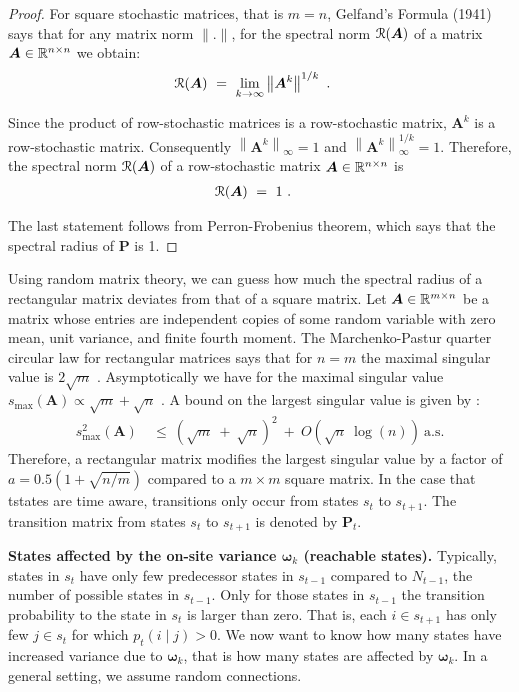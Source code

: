 \documentclass{article}
\newcommand\BA{\bm{A}}
\newcommand\BP{\bm{P}}
\newcommand\Bom{\bm{\omega}}
\renewcommand{\leq}{\leqslant}
\begin{document}
\begin{appendices}
\begin{proof}
For square stochastic matrices, that is $m=n$,
Gelfand's Formula (1941) says that
for any matrix norm $\| . \|$, for the spectral norm
$\cR(\BA)$ of a matrix $\BA \in \dR^{n\times n}$ we obtain:
\begin{align}
 \cR (\BA) \ &= \ \lim_{k\to \infty } \left\|\BA^k\right\|^{1/ k} \ .
\end{align} 


Since the product of row-stochastic matrices is a row-stochastic
matrix, $\BA^k$ is a row-stochastic matrix.
Consequently $\left\|\BA^k\right\|_{\infty}=1$ and $\left\|\BA^k\right\|_{\infty}^{1/ k}=1$. 
Therefore, the spectral norm
$\cR(\BA)$ of a row-stochastic matrix $\BA \in \dR^{n\times n}$
is
\begin{align}
 \cR (\BA) \ &= \  1 \ .
\end{align} 

The last statement follows from
Perron-Frobenius theorem, which says that the spectral radius of $\BP$ is 1. 
\end{proof}

Using random matrix theory, we can guess how much the spectral radius
of a rectangular matrix deviates from that of a square matrix.
Let $\BA \in \dR^{m \times n}$ be a matrix whose entries are independent copies of some random
variable with zero mean, unit variance, and finite fourth moment.
The Marchenko-Pastur quarter circular law for rectangular
matrices says that for $n=m$ the maximal singular value
is $2 \sqrt{m}$ \cite{Marchenko:67}.
Asymptotically we have for the maximal
singular value $s_{\max}(\BA) \propto \sqrt{m} + \sqrt{n}$ \cite{Rudelson:10}. 
A bound on the largest singular value is given by \cite{Soshnikov:02}:
\begin{align}
 s_{\max}^2(\BA) \ &\leq  \ (\sqrt{m} \ + \ \sqrt{n})^2 \ + \ O(\sqrt{n}
\ \log(n))  \ \text{a.s.} 
\end{align}
Therefore, a rectangular matrix modifies the largest singular value by a factor of 
$a = 0.5 (1 + \sqrt{n/m})$ compared to a $m\times m$ square matrix.
In the case that tstates are time aware, transitions only occur from
states $s_t$ to $s_{t+1}$. The transition matrix from
states $s_t$ to $s_{t+1}$ is denoted by $\BP_t$.

{\bf States affected by the on-site variance $\Bom_k$ (reachable states).}
Typically,   states in $s_t$ have only few predecessor states in
$s_{t-1}$ compared to $N_{t-1}$, the number of possible states in $s_{t-1}$.
Only for those states in $s_{t-1}$ the transition probability to the
state in $s_t$ is larger than zero.
That is, each $i \in s_{t+1}$ has only few $j \in s_t$ for which
$p_t(i \mid j)>0$.
We now want to know how many states have increased variance due to
$\Bom_k$, that is how many states are affected by $\Bom_k$.
In a general setting, we assume random connections.


\end{appendices}
\end{document}
